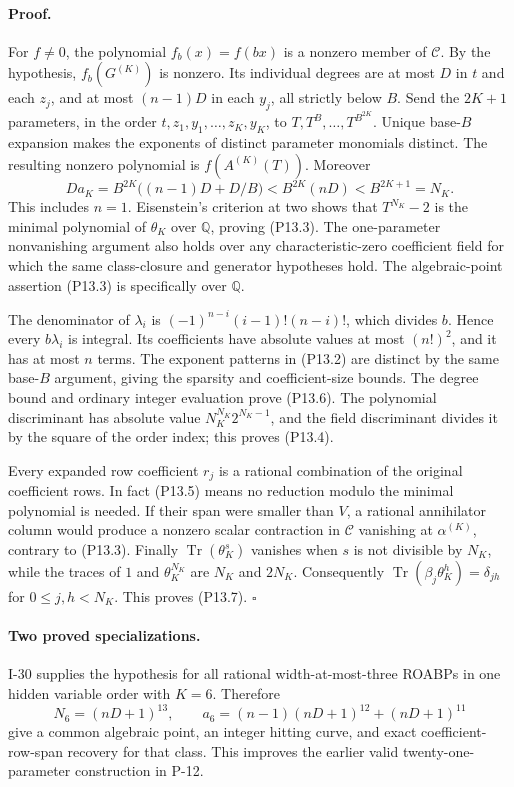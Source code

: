 \documentclass[11pt,a4paper]{article}
\theoremstyle{definition}\newtheorem{definition}{Definition}
\begin{document}
\paragraph{Proof.}
For $f\ne0$, the polynomial $f_b(x)=f(bx)$ is a nonzero member
of $\mathcal C$. By the hypothesis, $f_b(G^{(K)})$ is nonzero.
Its individual degrees are at most $D$ in $t$ and each $z_j$,
and at most $(n-1)D$ in each $y_j$, all strictly below $B$.
Send the $2K+1$ parameters, in the order
$t,z_1,y_1,\ldots,z_K,y_K$, to
$T,T^B,\ldots,T^{B^{2K}}$. Unique base-$B$ expansion makes
the exponents of distinct parameter monomials distinct.
The resulting nonzero polynomial is $f(A^{(K)}(T))$.
Moreover
\[
 Da_K=B^{2K}\bigl((n-1)D+D/B\bigr)
       <B^{2K}(nD)<B^{2K+1}=N_K.
\]
This includes $n=1$. Eisenstein's criterion at two shows that
$T^{N_K}-2$ is the minimal polynomial of $\theta_K$ over
$\mathbb Q$, proving (P13.3). The one-parameter nonvanishing
argument also holds over any characteristic-zero coefficient
field for which the same class-closure and generator hypotheses
hold. The algebraic-point assertion (P13.3) is specifically over
$\mathbb Q$.

The denominator of $\lambda_i$ is
$(-1)^{n-i}(i-1)!(n-i)!$, which divides $b$. Hence every
$b\lambda_i$ is integral. Its coefficients have absolute values
at most $(n!)^2$, and it has at most $n$ terms. The exponent
patterns in (P13.2) are distinct by the same base-$B$ argument,
giving the sparsity and coefficient-size bounds. The degree
bound and ordinary integer evaluation prove (P13.6). The
polynomial discriminant has absolute value
$N_K^{N_K}2^{N_K-1}$, and the field discriminant divides it by
the square of the order index; this proves (P13.4).

Every expanded row coefficient $r_j$ is a rational combination
of the original coefficient rows. In fact (P13.5) means no
reduction modulo the minimal polynomial is needed. If their
span were smaller than $V$, a rational annihilator column
would produce a nonzero scalar contraction in $\mathcal C$
vanishing at $\alpha^{(K)}$, contrary to (P13.3).
Finally $\operatorname{Tr}(\theta_K^s)$ vanishes when $s$ is not
divisible by $N_K$, while the traces of $1$ and $\theta_K^{N_K}$
are $N_K$ and $2N_K$. Consequently
$\operatorname{Tr}(\beta_j\theta_K^h)=\delta_{jh}$ for
$0\leq j,h<N_K$. This proves (P13.7). $\square$

\paragraph{Two proved specializations.}
I-30 supplies the hypothesis for all rational width-at-most-three
ROABPs in one hidden variable order with $K=6$. Therefore
\[
 N_6=(nD+1)^{13},\qquad
 a_6=(n-1)(nD+1)^{12}+(nD+1)^{11}
\]
give a common algebraic point, an integer hitting curve, and exact
coefficient-row-span recovery for that class. This improves the
earlier valid twenty-one-parameter construction in P-12.
\end{document}
